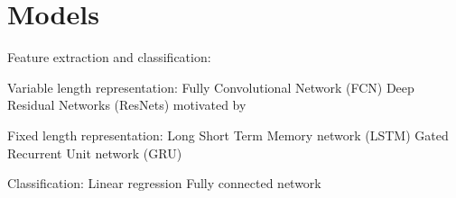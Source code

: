 \section{Models}

Feature extraction and classification:

Variable length representation:
Fully Convolutional Network (FCN) \cite{lecun1995convolutional, mittelman2015time}
Deep Residual Networks (ResNets) motivated by \cite{he2016deep, wang2016time}

Fixed length representation:
Long Short Term Memory network (LSTM)  \cite{hochreiter1997long, malhotra2015long}
Gated Recurrent Unit network (GRU) \cite{chung2014empirical}

Classification:
Linear regression
Fully connected network \cite{girshick2014rich}
